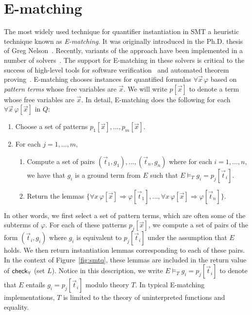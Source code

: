 \documentclass[oribibl]{llncs}
\begin{document}
\section{E-matching}
\label{sec:ematching}

The most widely used technique for quantifier instantiation in SMT a heuristic technique known as \emph{E-matching}.
It was originally introduced in the Ph.D. thesis of Greg Nelson~\cite{Nelson:1980:TPV:909447}.
Recently, variants of the approach have been implemented in a number of solvers~\cite{Detlefs03simplify:a,DBLP:conf/cav/BarrettT07,Z3,DBLP:conf/cade/BoutonODF09,CVC4-CAV-11,DBLP:conf/lpar/Rummer12}.
The support for E-matching in these solvers is critical to the success of high-level tools for 
software verification~\cite{DBLP:conf/icse/Leino04,DBLP:conf/itp/ChapmanS14} and automated theorem proving~\cite{blanchette2013extending,bobot2011why3}.
E-matching chooses instances for quantified formulas $\forall \vec x\, \varphi$
based on \emph{pattern terms} whose free variables are $\vec x$.
We will write $p[ \vec x ]$ to denote a term whose free variables are $\vec x$.
In detail, 
E-matching does the following for each $\forall \vec x\, \varphi[ \vec x ]$ in $Q$:
\begin{enumerate}
\item Choose a set of patterns $p_1[ \vec x ], \ldots, p_m[ \vec x ]$.
\item For each $j = 1, \ldots, m$,
\begin{enumerate}
\item Compute a set of pairs $(\vec t_{1},g_{1}), \ldots, (\vec t_{n}, g_{n})$ 
where for each $i = 1, \ldots, n$, we have that $g_i$ is a ground term from $E$ such that $E \models_T g_{i} = p_j[ \vec t_{i} ]$.
\item Return the lemmas $\{ \forall x\, \varphi[\vec x] \Rightarrow \varphi[\vec t_{1}], \ldots, \forall x\, \varphi[\vec x] \Rightarrow \varphi[\vec t_{n}] \}$.
\end{enumerate}
\end{enumerate}

In other words, we first select a set of pattern terms, which are often some of the subterms of $\varphi$.
For each of these patterns $p_j[ \vec x ]$, we compute a set of pairs of the form $( \vec t_i, g_i )$ where 
$g_i$ is equivalent to $p_j[ \vec t_i ]$ under the assumption that $E$ holds.
We then return instantiation lemmas corresponding to each of these pairs. 
In the context of Figure~\ref{fig:smtq}, these lemmas are included in the return value of $\small\mathsf{check}_\forall$ (set $L$).
Notice in this description, we write $E \models_T g_{i} = p_j[ \vec t_{i} ]$ to denote that $E$ entails
$g_{i} = p_j[ \vec t_{i} ]$ modulo theory $T$.  In typical E-matching implementations, $T$ is limited to the theory of uninterpreted functions and equality.
\end{document}
